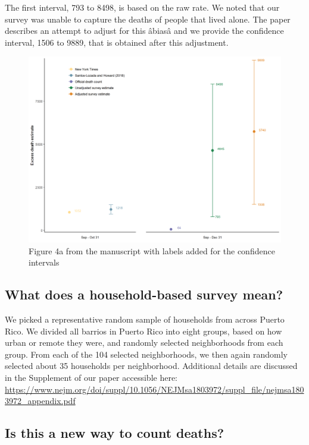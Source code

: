 \documentclass[]{article}
\begin{document}
The first interval, 793 to 8498, is based on the raw rate. We noted that
our survey was unable to capture the deaths of people that lived alone.
The paper describes an attempt to adjust for this âbiasâ and we
provide the confidence interval, 1506 to 9889, that is obtained after
this adjustment.

\begin{figure}
\centering
\includegraphics{../misc/faq_fig.png}
\caption{Figure 4a from the manuscript with labels added for the
confidence intervals}
\end{figure}

\subsection{What does a household-based survey
mean?}\label{what-does-a-household-based-survey-mean}

We picked a representative random sample of households from across
Puerto Rico. We divided all barrios in Puerto Rico into eight groups,
based on how urban or remote they were, and randomly selected
neighborhoods from each group. From each of the 104 selected
neighborhoods, we then again randomly selected about 35 households per
neighborhood. Additional details are discussed in the Supplement of our
paper accessible here:
\url{https://www.nejm.org/doi/suppl/10.1056/NEJMsa1803972/suppl_file/nejmsa1803972_appendix.pdf}

\subsection{Is this a new way to count
deaths?}\label{is-this-a-new-way-to-count-deaths}
\end{document}
